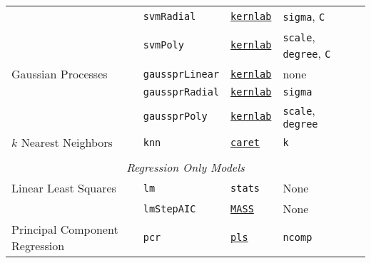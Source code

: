 \documentclass[12pt]{article}
\begin{document}
\begin{landscape}
\begin{longtable}{lllll}
  &
         \texttt{svmRadial} & 
            {\tt \href{http://cran.r-project.org/web/packages/kernlab/index.html}{kernlab}}      & 
            \texttt{sigma}, \texttt{C} \\             
      
  &
         \texttt{svmPoly} & 
            {\tt \href{http://cran.r-project.org/web/packages/kernlab/index.html}{kernlab}}      & 
            \texttt{scale}, \texttt{degree}, \texttt{C} \\            

\rowcolor[rgb]{.95, .95, .95}         
           Gaussian Processes  &
         \texttt{gaussprLinear} & 
            {\tt \href{http://cran.r-project.org/web/packages/kernlab/index.html}{kernlab}}      & 
            none \\             
            
\rowcolor[rgb]{.95, .95, .95}               
  &
         \texttt{gaussprRadial} & 
             {\tt \href{http://cran.r-project.org/web/packages/kernlab/index.html}{kernlab}}        & 
            \texttt{sigma} \\              

\rowcolor[rgb]{.95, .95, .95}               
  &
         \texttt{gaussprPoly} & 
             {\tt \href{http://cran.r-project.org/web/packages/kernlab/index.html}{kernlab}}       & 
            \texttt{scale}, \texttt{degree} \\            

                      
      $k$ Nearest Neighbors &
         \texttt{knn} & 
             {\tt \href{http://cran.r-project.org/web/packages/caret/index.html}{caret}}       & 
            \texttt{k} \\   
      
      \\
\multicolumn{5}{c}{{{ \em Regression Only Models}}} \\      
    
\rowcolor[rgb]{.95, .95, .95}             
      Linear Least Squares &
         \texttt{lm} & 
            \texttt{stats}       & 
            None \\  
            
\rowcolor[rgb]{.95, .95, .95}                     
            &
         \texttt{lmStepAIC} & 
             {\tt \href{http://cran.r-project.org/web/packages/MASS/index.html}{MASS}}       & 
            None \\  

       Principal Component Regression&
         \texttt{pcr} & 
             {\tt \href{http://cran.r-project.org/web/packages/pls/index.html}{pls}}      & 
            \texttt{ncomp}  \\  


\end{longtable}
\end{landscape}
\end{document}
